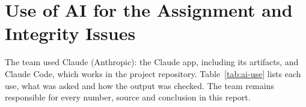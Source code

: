 \chapter*{Use of AI for the Assignment and Integrity Issues}
\label{chapter:ai-statement}




The team used Claude (Anthropic): the Claude app, including its artifacts, and
Claude Code, which works in the project repository. Table~\ref{tab:ai-use} lists
each use, what was asked and how the output was checked. The team remains
responsible for every number, source and conclusion in this report.

